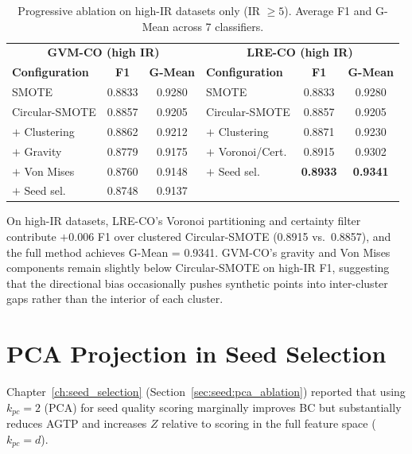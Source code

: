 \begin{table}[H]
\centering
\caption{Progressive ablation on high-IR datasets only (IR $\geq 5$). Average F1 and G-Mean across 7 classifiers.}
\label{tab:abl:progressive_highir}
\begin{tabular}{lcc|lcc}
\toprule
\multicolumn{3}{c|}{\textbf{GVM-CO (high IR)}} & \multicolumn{3}{c}{\textbf{LRE-CO (high IR)}} \\
\textbf{Configuration} & \textbf{F1} & \textbf{G-Mean} & \textbf{Configuration} & \textbf{F1} & \textbf{G-Mean} \\
\midrule
SMOTE             & 0.8833 & 0.9280 & SMOTE             & 0.8833 & 0.9280 \\
Circular-SMOTE    & 0.8857 & 0.9205 & Circular-SMOTE    & 0.8857 & 0.9205 \\
$+$ Clustering    & 0.8862 & 0.9212 & $+$ Clustering    & 0.8871 & 0.9230 \\
$+$ Gravity       & 0.8779 & 0.9175 & $+$ Voronoi/Cert. & 0.8915 & 0.9302 \\
$+$ Von Mises     & 0.8760 & 0.9148 & $+$ Seed sel.     & \textbf{0.8933} & \textbf{0.9341} \\
$+$ Seed sel.     & 0.8748 & 0.9137 & & & \\
\bottomrule
\end{tabular}
\end{table}

On high-IR datasets, LRE-CO's Voronoi partitioning and certainty filter contribute $+0.006$ F1 over clustered Circular-SMOTE (0.8915 vs.\ 0.8857), and the full method achieves G-Mean = 0.9341.
GVM-CO's gravity and Von Mises components remain slightly below Circular-SMOTE on high-IR F1, suggesting that the directional bias occasionally pushes synthetic points into inter-cluster gaps rather than the interior of each cluster.


\section{PCA Projection in Seed Selection}
\label{sec:abl:pca_seed}

Chapter~\ref{ch:seed_selection} (Section~\ref{sec:seed:pca_ablation}) reported that using $k_{pc}=2$ (PCA) for seed quality scoring marginally improves BC but substantially reduces AGTP and increases $Z$ relative to scoring in the full feature space ($k_{pc} = d$).

